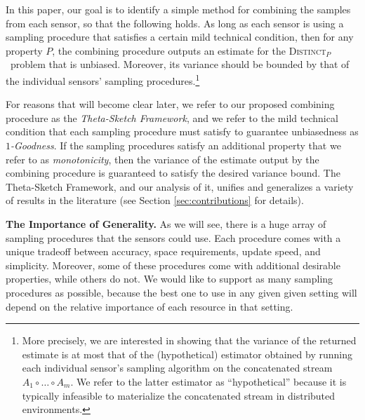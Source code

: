 \documentclass{article}
\newcommand{\eat}[1]{}
\newcommand{\distinctP}{\textsc{Distinct}$_P$}
\begin{document}
In this paper, our goal is to identify a simple method for combining the samples from each sensor, so that the following holds.
As long as each sensor is using a sampling procedure that satisfies a certain mild technical condition, then for any property $P$, the combining procedure outputs an estimate for
the \distinctP\ problem that is unbiased. Moreover, its variance should be bounded by that of the individual sensors' sampling procedures.\footnote{More precisely,
we are interested in showing that
the variance of the returned estimate is at most that of the (hypothetical) estimator obtained by running each individual sensor's sampling algorithm on the concatenated stream $A_1 \circ \dots \circ A_m$.
We refer to the latter estimator as ``hypothetical'' because it is typically infeasible to materialize the concatenated stream in distributed environments.} 


For reasons that will become clear later, we refer to our proposed combining procedure as the \emph{Theta-Sketch Framework}, and we refer to the mild technical condition
that each sampling procedure must satisfy to guarantee unbiasedness as \emph{$1$-Goodness}. If the sampling procedures
satisfy an additional property that we refer to as \emph{monotonicity}, then the variance of the estimate output by the combining procedure is guaranteed to satisfy the desired variance bound. The Theta-Sketch Framework, and our analysis of it, unifies and generalizes a variety of results in the literature (see Section \ref{sec:contributions} for details). 

\medskip
\noindent \textbf{The Importance of Generality.} As we will see, there is a huge array of sampling procedures that the sensors could use. Each procedure comes with a unique tradeoff between 
accuracy, space requirements, update speed, and simplicity. Moreover, some of these procedures come with additional desirable properties, while others do not. We would like to support as many sampling procedures as possible, because the best one to use in any given given setting
will depend on the relative importance of each resource in that setting. 

\eat{In addition, there are realistic scenarios where different sensors may use different sampling procedures, or may use the same sampling procedure but with different settings of parameters. 
For example, if different sensors have different amounts of available memory (say, because some sensors are newer than others), then the sensors with less memory will have to downsample 
more aggressively than the others. 
The guarantees of the Theta-Sketch Framework continue to hold when different sensors use different sampling procedures, as long as all of the sampling procedures used satisfy 1-Goodness. }
\end{document}
